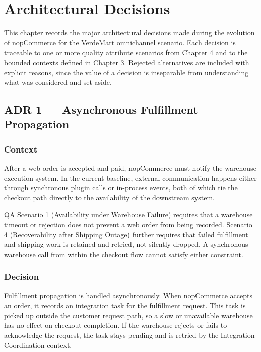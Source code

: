 \chapter{Architectural Decisions}

This chapter records the major architectural decisions made during the evolution of nopCommerce
for the VerdeMart omnichannel scenario. Each decision is traceable to one or more quality
attribute scenarios from Chapter 4 and to the bounded contexts defined in Chapter 3. Rejected
alternatives are included with explicit reasons, since the value of a decision is inseparable
from understanding what was considered and set aside.

\section{ADR 1 — Asynchronous Fulfillment Propagation}

\subsection{Context}

After a web order is accepted and paid, nopCommerce must notify the warehouse execution system.
In the current baseline, external communication happens either through synchronous plugin calls
or in-process events, both of which tie the checkout path directly to the availability of the
downstream system.

QA Scenario 1 (Availability under Warehouse Failure) requires that a warehouse timeout or
rejection does not prevent a web order from being recorded. Scenario 4 (Recoverability after
Shipping Outage) further requires that failed fulfillment and shipping work is retained and
retried, not silently dropped. A synchronous warehouse call from within the checkout flow
cannot satisfy either constraint.

\subsection{Decision}

Fulfillment propagation is handled asynchronously. When nopCommerce accepts an order, it
records an integration task for the fulfillment request. This task is picked up outside the
customer request path, so a slow or unavailable warehouse has no effect on checkout completion.
If the warehouse rejects or fails to acknowledge the request, the task stays pending and is
retried by the Integration Coordination context.

